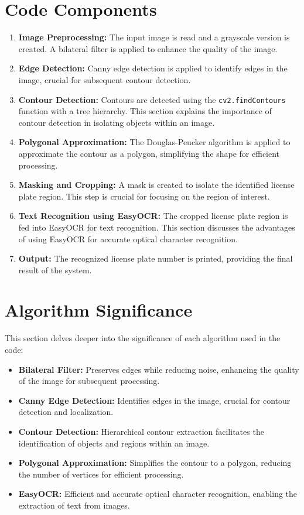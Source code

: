 \documentclass[conference]{IEEEtran}
\begin{document}
\section{Code Components}
\begin{enumerate}
    \item \textbf{Image Preprocessing:} The input image is read and a grayscale version is created. A bilateral filter is applied to enhance the quality of the image.
    \item \textbf{Edge Detection:} Canny edge detection is applied to identify edges in the image, crucial for subsequent contour detection.
    \item \textbf{Contour Detection:} Contours are detected using the \texttt{cv2.findContours} function with a tree hierarchy. This section explains the importance of contour detection in isolating objects within an image.
    \item \textbf{Polygonal Approximation:} The Douglas-Peucker algorithm is applied to approximate the contour as a polygon, simplifying the shape for efficient processing.
    \item \textbf{Masking and Cropping:} A mask is created to isolate the identified license plate region. This step is crucial for focusing on the region of interest.
    \item \textbf{Text Recognition using EasyOCR:} The cropped license plate region is fed into EasyOCR for text recognition. This section discusses the advantages of using EasyOCR for accurate optical character recognition.
    \item \textbf{Output:} The recognized license plate number is printed, providing the final result of the system.
\end{enumerate}

\section{Algorithm Significance}
This section delves deeper into the significance of each algorithm used in the code:
\begin{itemize}
    \item \textbf{Bilateral Filter:} Preserves edges while reducing noise, enhancing the quality of the image for subsequent processing.
    \item \textbf{Canny Edge Detection:} Identifies edges in the image, crucial for contour detection and localization.
    \item \textbf{Contour Detection:} Hierarchical contour extraction facilitates the identification of objects and regions within an image.
    \item \textbf{Polygonal Approximation:} Simplifies the contour to a polygon, reducing the number of vertices for efficient processing.
    \item \textbf{EasyOCR:} Efficient and accurate optical character recognition, enabling the extraction of text from images.
\end{itemize}
\end{document}
